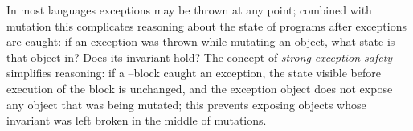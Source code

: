 {}\label{s:exceptions}
In most languages exceptions may be thrown at any point; combined with mutation this complicates reasoning about the state of programs after exceptions are caught: if an exception was thrown while mutating an object, what state is that object in? Does its invariant hold?
The concept of \emph{strong exception safety}~\cite{Abrahams2000,JOT:issue_2011_01/article1} simplifies reasoning:
if a \Q@try@--\Q@catch@ block caught an exception, the state visible before execution of the \Q@try@ block is unchanged, and the exception object does not expose any object that was being mutated; this prevents exposing objects whose invariant was left broken in the middle of mutations.

